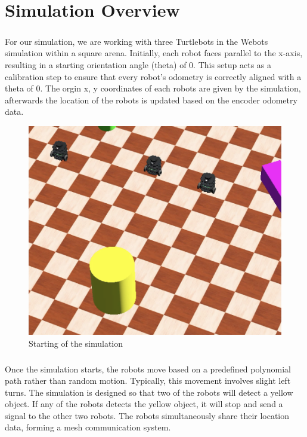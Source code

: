 \chapter{Simulation Overview}

\paragraph*{}
For our simulation, we are working with three Turtlebots in the Webots simulation within a square arena. Initially, each robot faces parallel to the x-axis, resulting in a starting orientation angle (theta) of 0. This setup acts as a calibration step to ensure that every robot's odometry is correctly aligned with a theta of 0. The orgin x, y coordinates of each robots are given by the simulation, afterwards the location of the robots is updated based on the encoder odometry data. 
\begin{figure} [H]
    \centering
    \includegraphics[width=0.75\linewidth]{assets/images/simulation_overview/bothdetect.png}
    \caption{Starting of the simulation}
    \label{fig:start-sim}
\end{figure}

\paragraph*{}
Once the simulation starts, the robots move based on a predefined polynomial path rather than random motion. Typically, this movement involves slight left turns. The simulation is designed so that two of the robots will detect a yellow object. If any of the robots detects the yellow object, it will stop and send a signal to the other two robots. The robots simultaneously share their location data, forming a mesh communication system.

